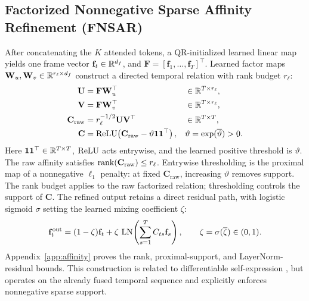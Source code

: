 \subsection{Factorized Nonnegative Sparse Affinity Refinement (FNSAR)}
After concatenating the $K$ attended tokens, a QR-initialized learned linear map yields one frame vector $\mathbf f_t\in\mathbb{R}^{d_f}$, and $\mathbf F=[\mathbf f_1,\ldots,\mathbf f_T]^\top$. Learned factor maps $\mathbf W_u,\mathbf W_v\in\mathbb{R}^{r_\ell\times d_f}$ construct a directed temporal relation with rank budget $r_\ell$:
\begin{equation}
\begin{alignedat}{2}
\mathbf U&=\mathbf F\mathbf W_u^\top &\quad&\in\mathbb{R}^{T\times r_\ell},\\
\mathbf V&=\mathbf F\mathbf W_v^\top &&\in\mathbb{R}^{T\times r_\ell},\\
\mathbf C_{\mathrm{raw}}&=r_\ell^{-1/2}\mathbf U\mathbf V^\top &&\in\mathbb{R}^{T\times T},\\
\mathbf C&=\operatorname{ReLU}\!\left(\mathbf C_{\mathrm{raw}}-\vartheta\mathbf1\mathbf1^\top\right),
&&\vartheta=\exp(\overline\vartheta)>0.
\end{alignedat}
\label{eq:fnsar-affinity}
\end{equation}
Here $\mathbf1\mathbf1^\top\in\mathbb{R}^{T\times T}$, $\operatorname{ReLU}$ acts entrywise, and the learned positive threshold is $\vartheta$. The raw affinity satisfies $\operatorname{rank}(\mathbf C_{\mathrm{raw}})\leq r_\ell$. Entrywise thresholding is the proximal map of a nonnegative $\ell_1$ penalty: at fixed $\mathbf C_{\mathrm{raw}}$, increasing $\vartheta$ removes support. The rank budget applies to the raw factorized relation; thresholding controls the support of $\mathbf C$. The refined output retains a direct residual path, with logistic sigmoid $\sigma$ setting the learned mixing coefficient $\zeta$:
\begin{equation}
\mathbf f_t^{\mathrm{out}}
=(1-\zeta)\mathbf f_t+
\zeta\,\operatorname{LN}\!\left(\sum_{s=1}^{T}C_{ts}\mathbf f_s\right),
\qquad \zeta=\sigma(\overline\zeta)\in(0,1).
\label{eq:fnsar-output}
\end{equation}
Appendix~\ref{app:affinity} proves the rank, proximal-support, and LayerNorm-residual bounds. This construction is related to differentiable self-expression \citep{elhamifar2013ssc,liu2013lrr,ji2017dsc}, but operates on the already fused temporal sequence and explicitly enforces nonnegative sparse support.

